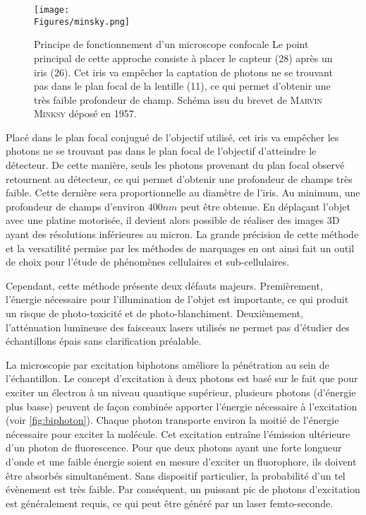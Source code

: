 \documentclass[\main/main.tex]{subfiles}
\begin{document}
\begin{figure}[h!]{\textwidth} 
    \centering
       \centering \texttt{[image: \\Figures/minsky.png]}
       \caption{
            \label{fig:confocal}
            Principe de fonctionnement d'un microscope confocale
            \newline
            Le point principal de cette approche consiste à placer le capteur (28) après un iris (26).
            Cet iris va empêcher la captation de photons ne se trouvant pas dans le plan focal de la lentille (11), ce qui permet d'obtenir une très faible profondeur de champ.
            \newline
            Schéma issu du brevet de \textsc{Marvin Minksy} déposé en 1957.
            }
\end{figure}
%
Placé dans le plan focal conjugué de l'objectif utilisé, cet iris va empêcher les photons ne se trouvant pas dans le plan focal de l'objectif d'atteindre le détecteur.
%
De cette manière, seuls les photons provenant du plan focal observé retournent au détecteur, ce qui permet d'obtenir une profondeur de champs très faible.
%
Cette dernière sera proportionnelle au diamètre de l'iris. Au minimum, une profondeur de champs d'environ $400 nm$ peut être obtenue.
%
En déplaçant l'objet avec une platine motorisée, il devient alors possible de réaliser des images 3D ayant des résolutions inférieures au micron.
%
La grande précision de cette méthode et la versatilité permise par les méthodes de marquages en ont ainsi fait un outil de choix pour l'étude de phénomènes cellulaires et sub-cellulaires.

%
Cependant, cette méthode présente deux défauts majeurs.
%
Premièrement, l'énergie nécessaire pour l'illumination de l'objet est importante, ce qui produit un risque de photo\hyp{}toxicité et de photo\hyp{}blanchiment.
%
Deuxièmement, l'atténuation lumineuse des faisceaux lasers utilisés ne permet pas d'étudier des échantillons épais sans clarification préalable.

%
La microscopie par excitation biphotons améliore la pénétration au sein de l'échantillon.
%
Le concept d'excitation à deux photons est basé sur le fait que pour exciter un électron à un niveau quantique supérieur, plusieurs photons (d’énergie plus basse) peuvent de façon combinée apporter l’énergie nécessaire à l’excitation (voir \autoref{fig:biphoton}).
%
Chaque photon transporte environ la moitié de l'énergie nécessaire pour exciter la molécule.
%
Cet excitation entraîne l'émission ultérieure d'un photon de fluorescence.%
%
Pour que deux photons ayant une forte longueur d'onde et une faible énergie soient en mesure d'exciter un fluorophore, ils doivent être absorbés simultanément. Sans dispositif particulier, la probabilité d'un tel évènement est très faible.
%
Par conséquent, un puissant pic de photons d'excitation est généralement requis, ce qui peut être généré par un laser femto\hyp{}seconde.
\end{document}

